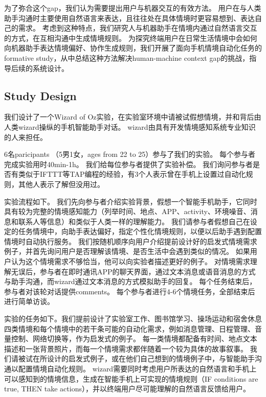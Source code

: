 为了弥合这个gap，我们认为需要提出用户与机器交互的有效方法。
用户在与人类助手沟通时主要使用自然语言来表达，且往往处在具体情境时更容易想到、表达自己的需求。
考虑到这种特点，我们研究人与机器助手在情境内通过自然语言交互的方式，在互相沟通中生成情境规则。
为探究终端用户在日常生活情境中会如何向机器助手表达情境偏好、协作生成规则，我们开展了面向手机情境自动化任务的formative study，从中总结这种方法解决human-machine context gap的挑战，指导后续的系统设计。


\subsection{Study Design}

我们设计了一个Wizard of Oz实验，在实验室环境中请被试假想情境，并和背后由人类wizard操纵的手机智能助手对话。
wizard由具有开发情境感知系统专业知识的人来担任。

6名paricipants （5男1女，ages from 22 to 25）参与了我们的实验。
每个参与者完成实验用时40min-1h。
我们给每位参与者提供了实验补偿。
我们询问参与者是否有类似于IFTTT等TAP编程的经验，有3个人表示曾在手机上设置过自动化规则，其他人表示了解但没用过。

实验流程如下。
我们先向参与者介绍实验背景，假想一个智能手机助手，它同时具有较为完整的情境感知能力（列举时间、地点、APP、activity、环境噪音、消息和联系人等信息）和类似于人类一样的理解能力。
我们请参与者假想自己在设定的任务情境中，向助手表达偏好，指定个性化情境规则，以便以后助手遇到配置情境时自动执行服务。
我们按随机顺序向用户介绍提前设计好的启发式情境需求例子，并首先询问用户是否理解该情境、是否生活中会遇到类似的情况。
如果用户认为这个情境需求不够恰当，他可以向实验者描述更好的例子。
对情境需求理解无误后，参与者在即时通讯APP的聊天界面，通过文本消息或语音消息的方式与助手沟通，而wizard通过文本消息的方式模拟助手的回复。
每个任务结束后，参与者对该轮对话提供comments。
每个参与者进行4-6个情境任务，全部结束后进行简单访谈。

实验的任务如下。我们提前设计了实验室工作、图书馆学习、操场运动和宿舍休息四类情境和每个情境中的若干条可能的自动化需求，例如消息管理、日程管理、音量控制、网络切换等，作为启发式的例子。
每一类情境都配备有时间、地点文本描述和一张背景照片，而每一个情境需求都伴随着一个较为具体的故事叙事。
我们请被试在所设计的启发式例子，或在他们自己想到的情境例子中，与智能助手沟通以配置情境自动化规则。
wizard需要同时考虑用户所表达的自然语言和手机上可以感知到的情境信息，生成在智能手机上可实现的情境规则（IF conditions are true, THEN take actions），并以终端用户尽可能理解的自然语言反馈给用户。

